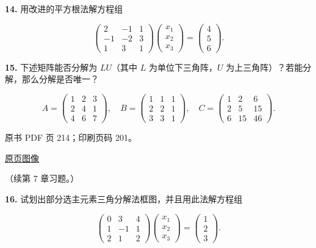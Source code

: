 \textbf{14.} 用改进的平方根法解方程组

\[
\begin{pmatrix}
2&-1&1\\
-1&-2&3\\
1&3&1
\end{pmatrix}
\begin{pmatrix}x_1\\x_2\\x_3\end{pmatrix}
=\begin{pmatrix}4\\5\\6\end{pmatrix}.
\]

\textbf{15.} 下述矩阵能否分解为 \(LU\)（其中 \(L\) 为单位下三角阵，\(U\) 为上三角阵）？若能分解，那么分解是否唯一？

\[
A=\begin{pmatrix}1&2&3\\2&4&1\\4&6&7\end{pmatrix},\quad
B=\begin{pmatrix}1&1&1\\2&2&1\\3&3&1\end{pmatrix},\quad
C=\begin{pmatrix}1&2&6\\2&5&15\\6&15&46\end{pmatrix}.
\]

\clearpage

原书 PDF 页 214；印刷页码 201。

\href{source-images/pdf-214.jpeg}{原页图像}

（续第 7 章习题。）

\textbf{16.} 试划出部分选主元素三角分解法框图，并且用此法解方程组

\[
\begin{pmatrix}0&3&4\\1&-1&1\\2&1&2\end{pmatrix}
\begin{pmatrix}x_1\\x_2\\x_3\end{pmatrix}
=\begin{pmatrix}1\\2\\3\end{pmatrix}.
\]

